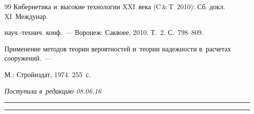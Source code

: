 {{\begin{thebibliography}{99}
Кибернетика и~высокие технологии XXI~века (C\,\&\,T~2010): Сб. докл. XI~Междунар. 

науч.-технич. конф.~--- Воронеж:  Саквоее, 2010. Т.~2. С.~798--809.





Применение методов теории вероятностей и~теории надежности в~расчетах сооружений.~--- 

М.: Стройиздат, 1974. 255~с.

     \end{thebibliography}

} }





\vspace*{-3pt}



\hfill{\small\textit{Поступила в~редакцию 08.06.16}}









\vspace*{6pt}



\hrule






\vspace*{2pt}



\hrule










\def\tit{SYMBOLIC ANALYTICAL MODELING OF~NORMAL PROCESSES IN~STOCHASTIC 

SYSTEMS WITH~COMPLEX FRACTION ORDER BESSEL NONLINEARITIES}



\def\titkol{Symbolic analytical modeling of~normal processes in~Sts 

with %

Bessel nonlinearities}





\def\aut{I.\,N.~Sinitsyn, E.\,R.~Korepanov, and~V.\,V.~Belousov}

